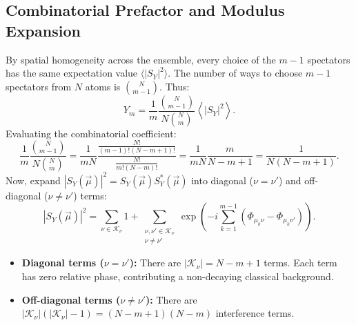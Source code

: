\documentclass[11pt,a4paper]{article}
\begin{document}
\subsection{Combinatorial Prefactor and Modulus Expansion}
By spatial homogeneity across the ensemble, every choice of the $m - 1$ spectators has the same expectation value $\langle |S_Y|^2 \rangle$. The number of ways to choose $m - 1$ spectators from $N$ atoms is $\binom{N}{m-1}$. Thus:
\begin{equation}
    Y_m = \frac{1}{m} \frac{\binom{N}{m-1}}{N \binom{N}{m}} \left\langle |S_Y|^2 \right\rangle.
\end{equation}
Evaluating the combinatorial coefficient:
\begin{equation}
    \frac{1}{m} \frac{\binom{N}{m-1}}{N \binom{N}{m}} = \frac{1}{m N} \frac{\frac{N!}{(m-1)!(N-m+1)!}}{\frac{N!}{m!(N-m)!}} = \frac{1}{m N} \frac{m}{N - m + 1} = \frac{1}{N (N - m + 1)}.
    \label{eq:comb_prefactor_Y}
\end{equation}
Now, expand $|S_Y(\vec{\mu})|^2 = S_Y(\vec{\mu}) S_Y^*(\vec{\mu})$ into diagonal ($\nu = \nu'$) and off-diagonal ($\nu \ne \nu'$) terms:
\begin{equation}
    |S_Y(\vec{\mu})|^2 = \sum_{\nu \in \mathcal{K}_\nu} 1 + \sum_{\substack{\nu, \nu' \in \mathcal{K}_\nu \\ \nu \ne \nu'}} \exp\left( -i \sum_{k=1}^{m-1} \left( \Phi_{\mu_k \nu} - \Phi_{\mu_k \nu'} \right) \right).
\end{equation}
\begin{itemize}
    \item \textbf{Diagonal terms ($\nu = \nu'$):} There are $|\mathcal{K}_\nu| = N - m + 1$ terms. Each term has zero relative phase, contributing a non-decaying classical background.
    \item \textbf{Off-diagonal terms ($\nu \ne \nu'$):} There are $|\mathcal{K}_\nu|(|\mathcal{K}_\nu| - 1) = (N - m + 1)(N - m)$ interference terms.
\end{itemize}
\end{document}
